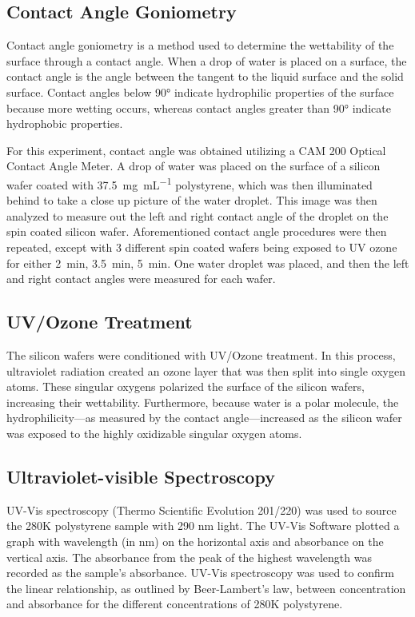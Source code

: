 \documentclass[twocolumn]{article}
\begin{document}
            \subsection{Contact Angle Goniometry}
                Contact angle goniometry is a method used to determine the wettability of the surface through a contact angle. When a drop of water is placed on a surface, the contact angle is the angle between the tangent to the liquid surface and the solid surface. Contact angles below 90° indicate hydrophilic properties of the surface because more wetting occurs, whereas contact angles greater than 90° indicate hydrophobic properties.
                
                For this experiment, contact angle was obtained utilizing a CAM 200 Optical Contact Angle Meter. A drop of water was placed on the surface of a silicon wafer coated with \qty{37.5}{\milli\gram\per\milli\liter} polystyrene, which was then illuminated behind to take a close up picture of the water droplet. This image was then analyzed to measure out the left and right contact angle of the droplet on the spin coated silicon wafer. Aforementioned contact angle procedures were then repeated, except with 3 different spin coated wafers being exposed to UV ozone for either \qty{2}{\minute}, \qty{3.5}{\minute}, \qty{5}{\minute}. One water droplet was placed, and then the left and right contact angles were measured for each wafer. 
            
            \subsection{UV/Ozone Treatment}
                The silicon wafers were conditioned with UV/Ozone treatment. In this process, ultraviolet radiation created an ozone layer that was then split into single oxygen atoms. These singular oxygens polarized the surface of the silicon wafers, increasing their wettability. Furthermore, because water is a polar molecule, the hydrophilicity---as measured by the contact angle---increased as the silicon wafer was exposed to the highly oxidizable singular oxygen atoms. 

            \subsection{Ultraviolet-visible Spectroscopy}
                UV-Vis spectroscopy (Thermo Scientific Evolution 201/220) was used to source the 280K polystyrene sample with 290 nm light. The UV-Vis Software plotted a graph with wavelength (in nm) on the horizontal axis and absorbance on the vertical axis. The absorbance from the peak of the highest wavelength was recorded as the sample's absorbance. UV-Vis spectroscopy was used to confirm the linear relationship, as outlined by Beer-Lambert's law, between concentration and absorbance for the different concentrations of 280K polystyrene.
\end{document}
